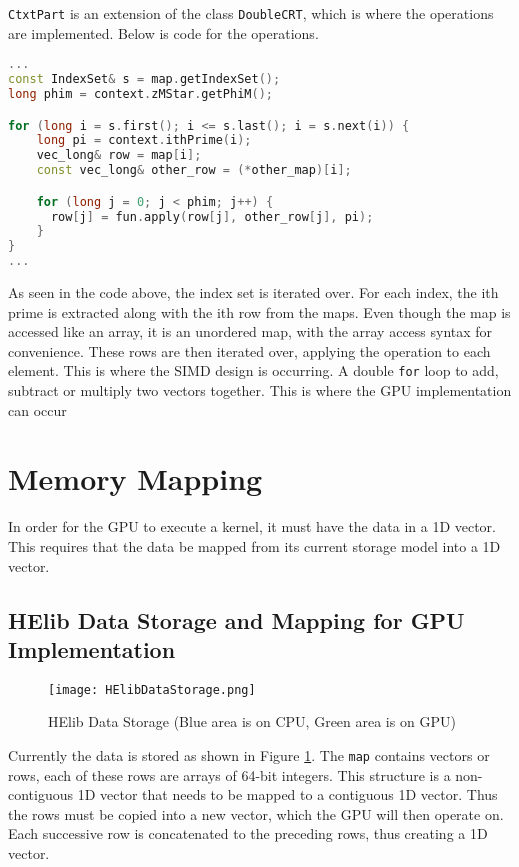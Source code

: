 \verb|CtxtPart| is an extension of the class \verb|DoubleCRT|, which is where the operations are implemented. Below is code for the operations.

\begin{lstlisting}[language=C++,caption={Add, Sub and Mul operations of two DoubleCRT objects}]
...
const IndexSet& s = map.getIndexSet();
long phim = context.zMStar.getPhiM();

for (long i = s.first(); i <= s.last(); i = s.next(i)) {
    long pi = context.ithPrime(i);
    vec_long& row = map[i];
    const vec_long& other_row = (*other_map)[i];

    for (long j = 0; j < phim; j++) {
      row[j] = fun.apply(row[j], other_row[j], pi);
    }
}
...
\end{lstlisting}

As seen in the code above, the index set is iterated over. For each index, the ith prime is extracted along with the ith row from the maps. Even though the map is accessed like an array, it is an unordered map, with the array access syntax for convenience. These rows are then iterated over, applying the operation to each element. This is where the SIMD design is occurring. A double \verb|for| loop to add, subtract or multiply two vectors together. This is where the GPU implementation can occur

\section{Memory Mapping} \label{sec:MemoryMapping}
In order for the GPU to execute a kernel, it must have the data in a 1D vector. This requires that the data be mapped from its current storage model into a 1D vector.

\subsection{HElib Data Storage and Mapping for GPU Implementation}

\begin{figure}[htp]
\centering
\texttt{[image: HElibDataStorage.png]}
\caption{HElib Data Storage (Blue area is on CPU, Green area is on GPU)}
\label{fig:HElibDataStorage}
\end{figure}

Currently the data is stored as shown in Figure \ref{fig:HElibDataStorage}. The \verb|map| contains vectors or rows, each of these rows are arrays of 64-bit integers. This structure is a non-contiguous 1D vector that needs to be mapped to a contiguous 1D vector. Thus the rows must be copied into a new vector, which the GPU will then operate on. Each successive row is concatenated to the preceding rows, thus creating a 1D vector.

